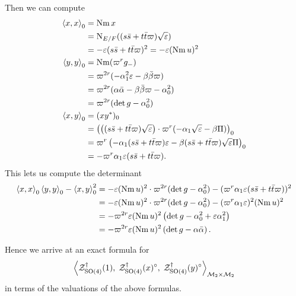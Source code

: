 Then we can compute
\begin{align*}
  \left\langle x,x \right\rangle _0 &= \operatorname{Nm} x \\
  &= \operatorname{N}_{E/F}((s \bar s + t \bar t \varpi)\sqrt{\varepsilon}) \\
  &= -\varepsilon(s \bar s + t \bar t \varpi)^2 = -\varepsilon (\operatorname{Nm} u)^2 \\
  \left\langle y,y \right\rangle _0 &= \operatorname{Nm} (\varpi^r g_-) \\
  &= \varpi^{2r} (-\alpha_1^2 \varepsilon - \beta\bar\beta \varpi) \\
  &= \varpi^{2r} (\alpha\bar\alpha - \beta\bar\beta \varpi - \alpha_0^2) \\
  &= \varpi^{2r}(\det g - \alpha_0^2) \\
  \left\langle x,y \right\rangle _0 &= (x y^\ast)_0 \\
  &= \left( \left( (s \bar s + t \bar t \varpi) \sqrt{\varepsilon} \right)
    \cdot \varpi^{r} (-\alpha_1\sqrt{\varepsilon} - \beta \Pi) \right)_0 \\
  &= \varpi^r \left( -\alpha_1 (s \bar s + t \bar t \varpi) \varepsilon
    - \beta (s \bar s + t \bar t \varpi) \sqrt{\varepsilon} \Pi \right)_0 \\
  &= - \varpi^r \alpha_1 \varepsilon (s \bar s + t \bar t \varpi).
\end{align*}
This lets us compute the determinant
\begin{align*}
  \left\langle x,x \right\rangle _0 \left\langle y,y \right\rangle _0 - \left\langle x,y \right\rangle^2_0
  &= - \varepsilon (\operatorname{Nm} u)^2\cdot \varpi^{2r} (\det g - \alpha_0^2)
  - (\varpi^r \alpha_1 \varepsilon (s \bar s + t \bar t \varpi))^2 \\
  &= - \varepsilon (\operatorname{Nm} u)^2\cdot \varpi^{2r} (\det g - \alpha_0^2)
  - (\varpi^r \alpha_1 \varepsilon)^2 (\operatorname{Nm} u)^2 \\
  &= -\varpi^{2r} \varepsilon (\operatorname{Nm} u)^2  \left( \det g - \alpha_0^2 + \varepsilon \alpha_1^2 \right) \\
  &= -\varpi^{2r} \varepsilon (\operatorname{Nm} u)^2  \left( \det g - \alpha \bar\alpha \right).
\end{align*}

Hence we arrive at an exact formula for
\[ \left< \mathcal Z^{\dagger}_{\operatorname{SO}(4)}(1), \; \mathcal Z^{\dagger}_{\operatorname{SO}(4)}(x)^\circ, \; \mathcal Z^{\dagger}_{\operatorname{SO}(4)}(y)^\circ \right>_{\mathcal M_2 \times \mathcal M_2} \]
in terms of the valuations of the above formulas.
